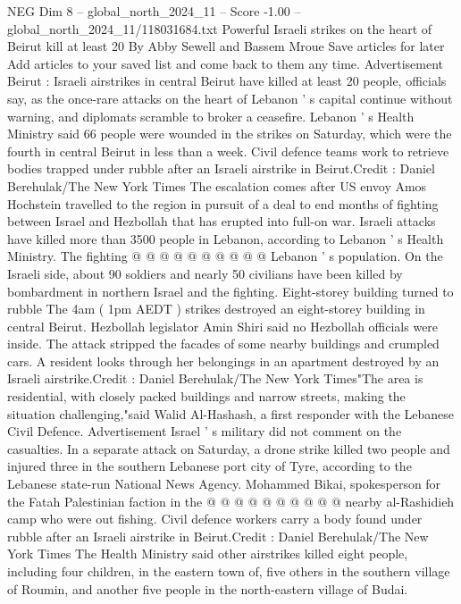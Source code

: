 \begin{textsample}{NEG Dim 8 – global\_north\_2024\_11 – Score -1.00 – global\_north\_2024\_11/118031684.txt}  \label{ex:f8_neg_308}
Powerful Israeli strikes on the heart of Beirut kill at least 20 By Abby Sewell and Bassem Mroue Save articles for later Add articles to your saved list and come back to them any time.
Advertisement Beirut : Israeli airstrikes in central Beirut have killed at least 20 people, officials say, as the once-rare attacks on the heart of Lebanon ' s capital continue without warning, and diplomats scramble to broker a ceasefire.
Lebanon ' s Health Ministry said 66 people were wounded in the strikes on Saturday, which were the fourth in central Beirut in less than a week.
Civil defence teams work to retrieve bodies trapped under rubble after an Israeli airstrike in Beirut.Credit : Daniel Berehulak/The New York Times The escalation comes after US envoy Amos Hochstein travelled to the region in pursuit of a deal to end months of fighting between Israel and Hezbollah that has erupted into full-on war.
Israeli attacks have killed more than 3500 people in Lebanon, according to Lebanon ' s Health Ministry.
The fighting @ @ @ @ @ @ @ @ @ @ Lebanon ' s population.
On the Israeli side, about 90 soldiers and nearly 50 civilians have been killed by bombardment in northern Israel and the fighting.
Eight-storey building turned to rubble The 4am ( 1pm AEDT ) strikes destroyed an eight-storey building in central Beirut.
Hezbollah legislator Amin Shiri said no Hezbollah officials were inside.
The attack stripped the facades of some nearby buildings and crumpled cars.
A resident looks through her belongings in an apartment destroyed by an Israeli airstrike.Credit : Daniel Berehulak/The New York Times"The area is residential, with closely packed buildings and narrow streets, making the situation challenging,"said Walid Al-Hashash, a first responder with the Lebanese Civil Defence.
Advertisement Israel ' s military did not comment on the casualties.
In a separate attack on Saturday, a drone strike killed two people and injured three in the southern Lebanese port city of Tyre, according to the Lebanese state-run National News Agency.
Mohammed Bikai, spokesperson for the Fatah Palestinian faction in the @ @ @ @ @ @ @ @ @ @ nearby al-Rashidieh camp who were out fishing.
Civil defence workers carry a body found under rubble after an Israeli airstrike in Beirut.Credit : Daniel Berehulak/The New York Times The Health Ministry said other airstrikes killed eight people, including four children, in the eastern town of, five others in the southern village of Roumin, and another five people in the north-eastern village of Budai.

\end{textsample}
